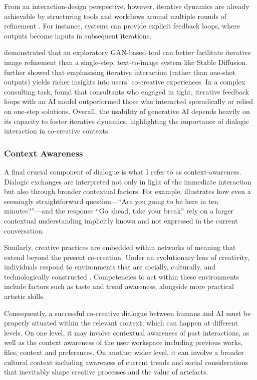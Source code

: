 From an interaction-design perspective, however, iterative dynamics are already achievable by structuring tools and workflows around multiple rounds of refinement \citep{Koch2020-gx, Lee2022-rj, Kim2023-wt}. For instance, systems can provide explicit feedback loops, where outputs become inputs in subsequent iterations.

\citet{Park2024-gw} demonstrated that an exploratory GAN-based tool can better facilitate iterative image refinement than a single-step, text-to-image system like Stable Diffusion. \citet{Lee2022-rj} further showed that emphasising iterative interaction (rather than one-shot outputs) yields richer insights into users' co-creative experiences. In a complex consulting task, \citet{DellAcqua2023-og} found that consultants who engaged in tight, iterative feedback loops with an AI model outperformed those who interacted sporadically or relied on one-step solutions. Overall, the usability of generative AI depends heavily on its capacity to foster iterative dynamics, highlighting the importance of dialogic interaction in co-creative contexts.

\subsubsection{Context Awareness}

A final crucial component of dialogue is what I refer to as context-awareness. Dialogic exchanges are interpreted not only in light of the immediate interaction but also through broader contextual factors. For example, \citet{Suchman2006-bs} illustrates how even a seemingly straightforward question—``Are you going to be here in ten minutes?''—and the response ``Go ahead, take your break'' rely on a larger contextual understanding implicitly known and not expressed in the current conversation. 

Similarly, creative practices are embedded within networks of meaning that extend beyond the present co-creation. Under an evolutionary lens of creativity, individuals respond to environments that are socially, culturally, and technologically constructed \citep{Bown2021-os}. Competencies to act within these environments include factors such as taste and trend awareness, alongside more practical artistic skills.

Consequently, a successful co-creative dialogue between humans and AI must be properly situated within the relevant context, which can happen at different levels. On one level, it may involve contextual awareness of past interactions, as well as the context awareness of the user workspace including previous works, files, context and preferences. On another wider level, it can involve a broader cultural context including awareness of current trends and social considerations that inevitably shape creative processes and the value of artefacts.

